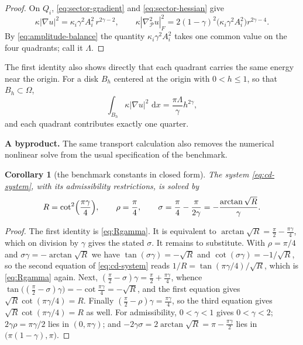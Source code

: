 \documentclass[10pt,pdftex]{amsart}%
\newtheorem{cor}[thm]{Corollary}
\numberwithin{equation}{section}
\newcommand{\dd}{\,\mathrm{d}}
\newcommand{\Pcal}{\mathcal{P}}
\newcommand{\gradb}{\nabla_{\Pcal}}
\begin{document}
\begin{proof}
On $Q_i$, \eqref{eq:sector-gradient} and \eqref{eq:sector-hessian} give
\[
\kappa|\nabla u|^2=\kappa_i\gamma^2A_i^2\,r^{2\gamma-2}, \qquad \kappa|\gradb^2u|_F^2=2(1-\gamma)^2\bigl(\kappa_i\gamma^2A_i^2\bigr)r^{2\gamma-4}.
\]
By \eqref{eq:amplitude-balance} the quantity $\kappa_i\gamma^2A_i^2$ takes one common value on the four quadrants; call it $\Lambda$.
\end{proof}

The first identity also shows directly that each quadrant carries the same energy near the origin.  For a disk $B_h$ centered at the origin with $0<h\le1$, so that $B_h\subset\Omega$,
\begin{equation}\label{eq:energy-scale}
 \int_{B_h}\kappa|\nabla u|^2\,\dd x
 =\frac{\pi\Lambda}{\gamma}h^{2\gamma},
\end{equation}
and each quadrant contributes exactly one quarter.

\medskip \noindent\textbf{A byproduct.} The same transport calculation also removes the numerical nonlinear solve from the usual specification of the benchmark.

\begin{cor}[the benchmark constants in closed form]\label{cor:closed}
The system \eqref{eq:cd-system}, with its admissibility restrictions, is solved by
\begin{equation}\label{eq:closed}
  R=\cot^2\Bigl(\frac{\pi\gamma}{4}\Bigr),
  \qquad
  \rho=\frac{\pi}{4},
  \qquad
  \sigma=\frac{\pi}{4}-\frac{\pi}{2\gamma}=-\frac{\arctan\sqrt R}{\gamma} .
\end{equation}
\end{cor}

\begin{proof}
The first identity is \eqref{eq:Rgamma}.  It is equivalent to $\arctan\sqrt R=\frac\pi2-\frac{\pi\gamma}{4}$, which on division by $\gamma$ gives the stated $\sigma$.  It remains to substitute.  With $\rho=\pi/4$ and $\sigma\gamma=-\arctan\sqrt R$ we have $\tan(\sigma\gamma)=-\sqrt R$ and $\cot(\sigma\gamma)=-1/\sqrt R$, so the second equation of \eqref{eq:cd-system} reads $1/R=\tan(\pi\gamma/4)/\sqrt R$, which is \eqref{eq:Rgamma} again.  Next, $(\tfrac\pi2-\sigma)\gamma=\frac\pi2+\frac{\pi\gamma}{4}$, whence $\tan\bigl((\tfrac\pi2-\sigma)\gamma\bigr)=-\cot\frac{\pi\gamma}{4}=-\sqrt R$, and the first equation gives $\sqrt R\cot(\pi\gamma/4)=R$.  Finally $(\tfrac\pi2-\rho)\gamma=\frac{\pi\gamma}{4}$, so the third equation gives $\sqrt R\cot(\pi\gamma/4)=R$ as well.  For admissibility, $0<\gamma<1$ gives $0<\gamma<2$; $2\gamma\rho=\pi\gamma/2$ lies in $(0,\pi\gamma)$; and $-2\gamma\sigma=2\arctan\sqrt R=\pi-\frac{\pi\gamma}{2}$ lies in $\bigl(\pi(1-\gamma),\pi\bigr)$.
\end{proof}
\end{document}
